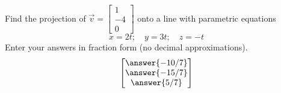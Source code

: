 \documentclass{ximera}
\author{}
\begin{document}
\begin{exercise}
Find the projection of $\vec{v}=\begin{bmatrix}1\\-4\\0\end{bmatrix}$ onto a line with parametric equations $$x=2t;\quad y=3t;\quad z=-t$$
Enter your answers in fraction form (no decimal approximations).
$$\begin{bmatrix}\answer{-10/7}\\\answer{-15/7}\\\answer{5/7}\end{bmatrix}$$
\end{exercise}
\end{document}
